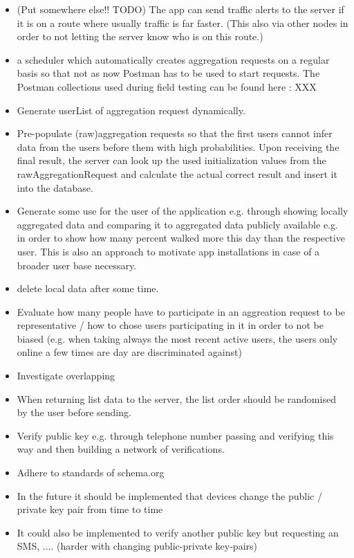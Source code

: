 \begin{itemize}
	\item (Put somewhere else!! TODO) The app can send traffic alerts to the server if it is on a route where usually traffic is far faster. (This also via other nodes in order to not letting the server know who is on this route.)
	\item a scheduler which automatically creates aggregation requests on a regular basis so that not as now Postman has to be used to start requests. The Postman collections used during field testing can be found here : XXX
	\item Generate userList of aggregation request dynamically.
	\item Pre-populate (raw)aggregation requests so that the first users cannot infer data from the users before them with high probabilities. Upon receiving the final result, the server can look up the used initialization values from the rawAggregationRequest and calculate the actual correct result and insert it into the database.
	\item Generate some use for the user of the application e.g. through showing locally aggregated data and comparing it to aggregated data publicly available e.g. in order to show how many percent walked more this day than the respective user. This is also an approach to motivate app installations in case of a broader user base necessary.
	\item delete local data after some time.
	\item Evaluate how many people have to participate in an aggreation request to be representative / how to chose users participating in it in order to not be biased (e.g. when taking always the most recent active users, the users only online a few times are day are discriminated against)
	\item Investigate overlapping
	\item When returning list data to the server, the list order should be randomised by the user before sending.
	\item Verify public key e.g. through telephone number passing and verifying this way and then building a network of verifications.
	\item Adhere to standards of schema.org
	\item In the future it should be implemented that devices change the public / private key pair from time to time
	\item It could also be implemented to verify another public key but requesting an SMS, .... (harder with changing public-private key-pairs)

\end{itemize}
